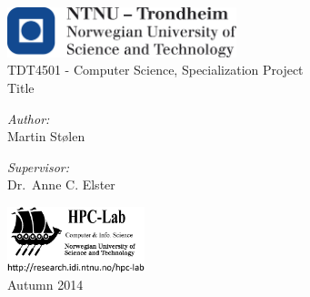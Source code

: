\begin{titlepage}
\begin{center}

	\includegraphics[width=0.5\textwidth]{images/logo_ntnu_eng}~\\[1cm]

	{\large TDT4501 - Computer Science, Specialization Project}\\[0.3cm]

	{\huge Title}\\[1.5cm]

	\noindent
	\begin{minipage}{0.4\textwidth}
		\begin{flushleft}
		\emph{Author:}\\
		Martin Stølen
		\end{flushleft}
	\end{minipage}
	\begin{minipage}{0.4\textwidth}
		\begin{flushright}
		\emph{Supervisor:}\\
		Dr.~Anne C. Elster
		\end{flushright}
	\end{minipage}

	\vfill
	\includegraphics[width=0.3\textwidth]{images/hpc-lab-no-ntnu-logo}~\\[0.5cm]
	{Autumn 2014}

\end{center}
\end{titlepage}
